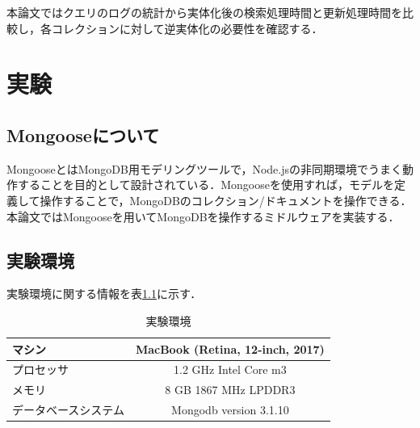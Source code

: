 \documentclass[a4paper,11pt]{ujreport}
\begin{document}
本論文ではクエリのログの統計から実体化後の検索処理時間と更新処理時間を比較し，各コレクションに対して逆実体化の必要性を確認する．

\chapter{実験}
\section{Mongooseについて}
MongooseとはMongoDB用モデリングツールで，Node.jsの非同期環境でうまく動作することを目的として設計されている．Mongooseを使用すれば，モデルを定義して操作することで，MongoDBのコレクション/ドキュメントを操作できる\cite{mongoose}．本論文ではMongooseを用いてMongoDBを操作するミドルウェアを実装する．

\section{実験環境}
実験環境に関する情報を表\ref{table:experiment_env}に示す．
\begin{table}[htb]
  \begin{center}
    \caption{実験環境}
		\label{table:experiment_env}
    \begin{tabular}{|l|c|} \hline
      マシン & MacBook (Retina, 12-inch, 2017) \\ \hline
      プロセッサ & 1.2 GHz Intel Core m3\\ \hline
      メモリ & 8 GB 1867 MHz LPDDR3\\ \hline
      データベースシステム & Mongodb version 3.1.10\\ \hline
    \end{tabular}
  \end{center}
\end{table}
\end{document}
